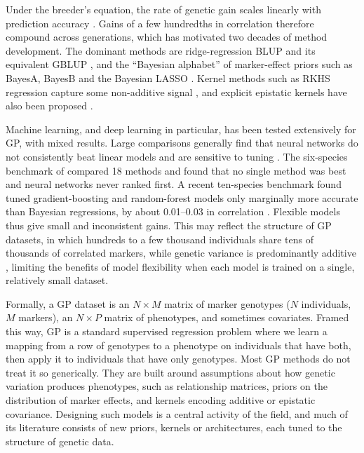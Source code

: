 \documentclass[11pt]{article}
\begin{document}
Under the breeder's equation, the rate of genetic gain scales linearly with prediction accuracy \citep{falconer1996}. Gains of a few hundredths in correlation therefore compound across generations, which has motivated two decades of method development. The dominant methods are ridge-regression BLUP and its equivalent GBLUP \citep{vanraden2008,endelman2011}, and the ``Bayesian alphabet'' of marker-effect priors such as BayesA, BayesB and the Bayesian LASSO \citep{meuwissen2001,delosCampos2013,gianola2013}. Kernel methods such as RKHS regression capture some non-additive signal \citep{gianola2006}, and explicit epistatic kernels have also been proposed \citep{jiang2015}.

Machine learning, and deep learning in particular, has been tested extensively for GP, with mixed results. Large comparisons generally find that neural networks do not consistently beat linear models and are sensitive to tuning \citep{bellot2018,perezenciso2019,montesinos2021}. The six-species benchmark of \citet{azodi2019} compared 18 methods and found that no single method was best and neural networks never ranked first. A recent ten-species benchmark found tuned gradient-boosting and random-forest models only marginally more accurate than Bayesian regressions, by about 0.01--0.03 in correlation \citep{quesadatraver2025}. Flexible models thus give small and inconsistent gains. This may reflect the structure of GP datasets, in which hundreds to a few thousand individuals share tens of thousands of correlated markers, while genetic variance is predominantly additive \citep{hill2008}, limiting the benefits of model flexibility when each model is trained on a single, relatively small dataset.

Formally, a GP dataset is an $N \times M$ matrix of marker genotypes ($N$ individuals, $M$ markers), an $N \times P$ matrix of phenotypes, and sometimes covariates. Framed this way, GP is a standard supervised regression problem where we learn a mapping from a row of genotypes to a phenotype on individuals that have both, then apply it to individuals that have only genotypes. Most GP methods do not treat it so generically. They are built around assumptions about how genetic variation produces phenotypes, such as relationship matrices, priors on the distribution of marker effects, and kernels encoding additive or epistatic covariance. Designing such models is a central activity of the field, and much of its literature consists of new priors, kernels or architectures, each tuned to the structure of genetic data.
\end{document}
